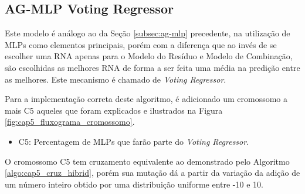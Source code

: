 \subsection{AG-MLP Voting Regressor}
\label{subsec:ag-mlp-vr}

Este modelo é análogo ao da Seção \ref{subsec:ag-mlp} precedente, na utilização de MLPs como elementos principais, porém com a diferença que ao invés de se escolher uma RNA apenas para o Modelo do Resíduo e Modelo de Combinação, são escolhidas as melhores RNA de forma a ser feita uma média na predição entre as melhores. Este mecanismo é chamado de \textit{Voting Regressor}. 

Para a implementação correta deste algoritmo, é adicionado um cromossomo a mais C5 aqueles que foram explicados e ilustrados na Figura \ref{fig:cap5_fluxograma_cromossomo}. 

\begin{itemize}
    \item C5: Percentagem de MLPs que farão parte do \textit{Voting Regressor}.
\end{itemize}

O cromossomo C5 tem cruzamento equivalente ao demonstrado pelo Algoritmo \ref{algo:cap5_cruz_hibrid}, porém sua mutação dá a partir da variação da adição de um número inteiro obtido por uma distribuição uniforme entre -10 e 10. 

